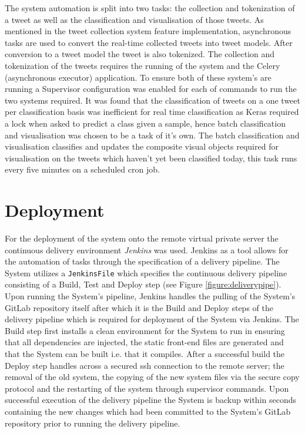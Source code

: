 \documentclass[11pt]{report}
\begin{document}
The system automation is split into two tasks: the collection and tokenization of a tweet as well as the classification and visualisation of those tweets. As mentioned in the tweet collection system feature implementation, asynchronous tasks are used to convert the real-time collected tweets into tweet models. After conversion to a tweet model the tweet is also tokenized. The collection and tokenization of the tweets requires the running of the system  and the Celery (asynchronous executor) application. To ensure both of these system's are running a Supervisor configuration was enabled for each of commands to run the two systems required. It was found that the classification of tweets on a one tweet per classification basis was inefficient for real time classification as Keras required a lock when asked to predict a class given a sample, hence batch classification and visualisation was chosen to be a task of it's own. The batch classification and visualisation classifies and updates the composite visual objects required for visualisation on the tweets which haven't yet been classified today, this task runs every five minutes on a scheduled cron job.


\enlargethispage{\baselineskip}
\section{Deployment}
\label{sec:deployment}
For the deployment of the system onto the remote virtual private server the continuous delivery environment \textit{Jenkins} was used. Jenkins as a tool allows for the automation of tasks through the specification of a delivery pipeline. The System utilizes a \texttt{JenkinsFile} which specifies the continuous delivery pipeline consisting of a Build, Test and Deploy step (see Figure \ref{figure:deliverypipe}). Upon running the System's pipeline, Jenkins handles the pulling of the System's GitLab repository itself after which it is the Build and Deploy steps of the delivery pipeline which is required for deployment of the System via Jenkins. The Build step first installs a clean environment for the System to run in ensuring that all dependencies are injected, the static front-end files are generated and that the System can be built i.e. that it compiles. After a successful build the Deploy step handles across a secured ssh connection to the remote server; the removal of the old system, the copying of the new system files via the secure copy protocol and the restarting of the system through supervisor commands. Upon successful execution of the delivery pipeline the System is backup within seconds containing the new changes which had been committed to the System's GitLab repository prior to running the delivery pipeline. 
\\
\end{document}
